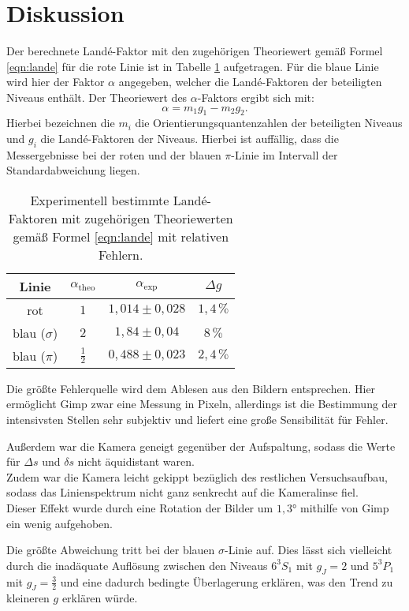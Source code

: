 \section{Diskussion}
\label{sec:Diskussion}
Der berechnete Landé-Faktor mit den zugehörigen Theoriewert gemäß Formel \eqref{eqn:lande} für die rote Linie
ist in Tabelle \ref{tab:result} aufgetragen.
Für die blaue Linie wird hier der Faktor $\alpha$ angegeben, welcher die Landé-Faktoren der beteiligten Niveaus enthält.
Der Theoriewert des $\alpha$-Faktors ergibt sich mit:
\begin{equation*}
\alpha=m_1g_1-m_2g_2 \mathrm{.}
\end{equation*}
Hierbei bezeichnen die $m_i$ die Orientierungsquantenzahlen der beteiligten Niveaus und $g_i$ die Landé-Faktoren der Niveaus.
Hierbei ist auffällig, dass die Messergebnisse bei der roten und der blauen $\pi$-Linie
im Intervall der Standardabweichung liegen.
\begin{table}
	\centering
	\caption{Experimentell bestimmte Landé-Faktoren mit zugehörigen Theoriewerten gemäß Formel \eqref{eqn:lande} mit relativen Fehlern.}
	 \label{tab:result}
	 \begin{tabular}{c | c | c | c}
	 	\toprule
		 Linie & $\alpha_{\text{theo}}$ & $\alpha_{\text{exp}}$ & $\Delta g$ \\
		\midrule
		rot & $1$ & $1,014\pm0,028$ & $1,4\, \si{\percent}$ \\
		blau ($\sigma$) & $2$ & $1,84\pm0,04$ & $8 \, \si{\percent}$ \\
		blau ($\pi$)    & $\frac{1}{2}$ & $0,488\pm0,023$ & $2,4\,\si{\percent}$ \\
		\bottomrule
	\end{tabular}
\end{table}
Die größte Fehlerquelle wird dem Ablesen aus den Bildern entsprechen. Hier ermöglicht
Gimp \cite{gimp} zwar eine Messung in Pixeln, allerdings ist die Bestimmung der intensivsten
Stellen sehr subjektiv und liefert eine große Sensibilität für Fehler.

Außerdem war die Kamera geneigt gegenüber der Aufspaltung, sodass die Werte für $\Delta s$ und
$\delta s$ nicht äquidistant waren.\\
Zudem war die Kamera leicht gekippt bezüglich des restlichen Versuchsaufbau, sodass das Linienspektrum nicht ganz senkrecht auf die Kameralinse fiel.\\
Dieser Effekt wurde durch eine Rotation der Bilder um $1,3°$ mithilfe von Gimp \cite{gimp} ein wenig aufgehoben.

Die größte Abweichung tritt bei der blauen $\sigma$-Linie auf. Dies lässt sich vielleicht durch
die inadäquate Auflösung zwischen den Niveaus $6^3S_1$ mit $g_J=2$ und $5^3P_1$ mit $g_J=\frac{3}{2}$ und eine dadurch bedingte Überlagerung erklären, was den Trend zu kleineren $g$ erklären würde.
